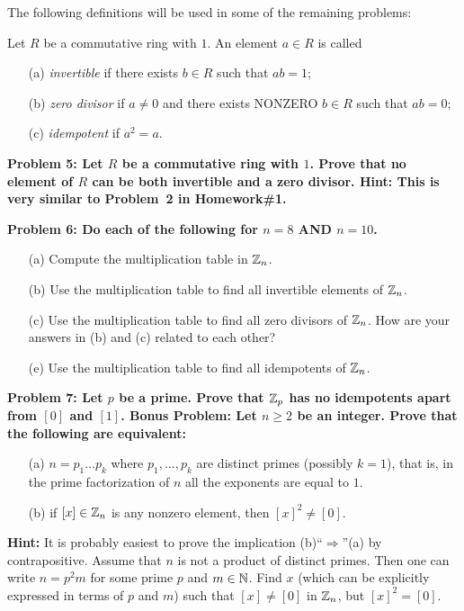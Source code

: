\documentclass[11pt]{amsart}
\begin{document}
The following definitions will be used in some of the remaining problems:

Let $R$ be a commutative ring with $1$. An element $a\in R$ is called
\begin{itemize}
\item[(a)] {\it invertible} if there exists $b\in R$ such that $ab=1$;
\item[(b)] {\it zero divisor} if $a\neq 0$ and there exists NONZERO $b\in R$ such that
$ab=0$; 
\item[(c)] {\it idempotent} if $a^2=a$.
\end{itemize}
\skv

\bf{Problem 5: }\rm Let $R$ be a commutative ring with $1$. 
Prove that no element of $R$ can be both invertible 
and a zero divisor. {\bf Hint:} This is very similar to Problem~2 in Homework\#1.
\skv

\bf{Problem 6: }\rm Do each of the following for $n=8$ AND $n=10$. 
\begin{itemize}
\item[(a)] Compute the multiplication table in ${\mathbb Z}_n$.
\item[(b)] Use the multiplication table to find all invertible elements of ${\mathbb Z}_n$. 
\item[(c)] Use the multiplication table to find all zero divisors of ${\mathbb Z}_n$. How are your answers in (b) and (c) related to each other?
\item[(e)] Use the multiplication table to find all idempotents of ${\mathbb Z}_n$.
\end{itemize}
\skv
\skv
\bf{Problem 7: }\rm Let $p$ be a prime. Prove that ${\mathbb Z}_p$ has no idempotents apart from $[0]$ and $[1]$.
\skv
\bf{Bonus Problem: }\rm Let $n\geq 2$ be an integer. Prove that the following are equivalent:
\begin{itemize}
\item[(a)] $n=p_1\ldots p_k$ where $p_1,\ldots, p_k$ are distinct primes (possibly $k=1$), that is, 
in the prime factorization of $n$ all the exponents are equal to $1$.
\item[(b)] if $[x]\in{\mathbb Z}_n$ is any nonzero element, then $[x]^2\neq [0]$.
\end{itemize}
{\bf Hint:} It is probably easiest to prove the implication (b)``$\Rightarrow$''(a) by contrapositive. Assume that $n$ is not a product of distinct primes. Then one can write $n=p^2m$ for some prime $p$ and $m\in{\mathbb N}$.
Find $x$ (which can be explicitly expressed in terms of $p$ and $m$) such that $[x]\neq [0]$ in ${\mathbb Z}_n$, but
$[x]^2=[0]$.
\end{document}
